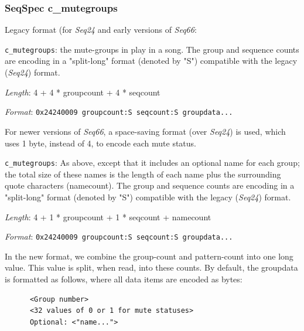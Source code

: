 \subsubsection{SeqSpec c\_mutegroups}
\label{subsubsec:midi_format_track_seqspec_mutegroups}

   Legacy format (for \textsl{Seq24} and early versions of \textsl{Seq66}:

   \begin{description}
      \item \texttt{c\_mutegroups}: the mute-groups in play in a song.
         The group and sequence counts are encoding in
         a "split-long" format (denoted by "S") compatible with the legacy
         (\textsl{Seq24}) format.
      \item \textsl{Length}: 4 + 4 * groupcount + 4 * seqcount
      \item \textsl{Format}: \texttt{0x24240009 groupcount:S seqcount:S groupdata...}
   \end{description}

   For newer versions of \textsl{Seq66},
   a space-saving format (over \textsl{Seq24}) is used, which uses 1 byte,
   instead of 4, to encode each mute status.

   \begin{description}
      \item \texttt{c\_mutegroups}: As above, except that it
         includes an optional name for each group; the total size of these
         names is the length of each name plus the surrounding quote
         characters (namecount).  The group and sequence counts are encoding in
         a "split-long" format (denoted by "S") compatible with the legacy
         (\textsl{Seq24}) format.
      \item \textsl{Length}: 4 + 1 * groupcount + 1 * seqcount + namecount
      \item \textsl{Format}: \texttt{0x24240009 groupcount:S seqcount:S groupdata...}
   \end{description}

   In the new format, we combine the group-count and pattern-count into
   one long value. This value is split, when read, into these counts.
   By default, the groupdata is formatted as follows, where all data items are
   encoded as bytes:

   \begin{verbatim}
      <Group number>
      <32 values of 0 or 1 for mute statuses>
      Optional: <"name...">
   \end{verbatim}

